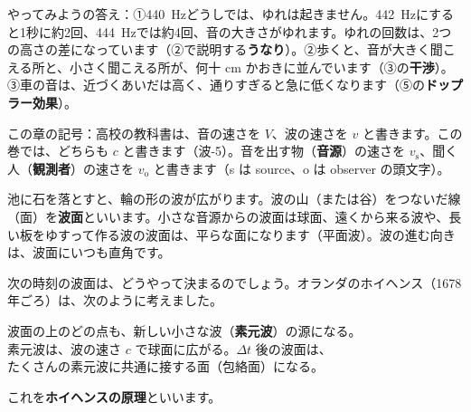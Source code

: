 \noindent やってみようの答え：①\qty{440}{Hz}どうしでは、ゆれは起きません。\qty{442}{Hz}にすると1秒に約2回、\qty{444}{Hz}では約4回、音の大きさがゆれます。ゆれの回数は、2つの高さの差になっています（②で説明する\textbf{うなり}）。②歩くと、音が大きく聞こえる所と、小さく聞こえる所が、何十 cm かおきに並んでいます（③の\textbf{干渉}）。③車の音は、近づくあいだは高く、通りすぎると急に低くなります（⑤の\textbf{ドップラー効果}）。

\begin{omoidasou}
\end{omoidasou}

\noindent この章の記号：高校の教科書は、音の速さを $V$、波の速さを $v$ と書きます。この巻では、どちらも $c$ と書きます（波-5）。音を出す物（\textbf{音源}）の速さを $v_{\mathrm s}$、聞く人（\textbf{観測者}）の速さを $v_{\mathrm o}$ と書きます（s は source、o は observer の頭文字）。


\label{ph:波-8:sec1}
池に石を落とすと、輪の形の波が広がります。波の山（または谷）をつないだ線（面）を\textbf{波面}といいます。小さな音源からの波面は球面、遠くから来る波や、長い板をゆすって作る波の波面は、平らな面になります（平面波）。波の進む向きは、波面にいつも直角です。

次の時刻の波面は、どうやって決まるのでしょう。オランダのホイヘンス（1678年ごろ）は、次のように考えました。
\begin{bkcenter}
波面の上のどの点も、新しい小さな波（\textbf{素元波}）の源になる。\\
素元波は、波の速さ $c$ で球面に広がる。$\Delta t$ 後の波面は、\\
たくさんの素元波に共通に接する面（包絡面）になる。
\end{bkcenter}
\label{ph:波-8:huygens}これを\textbf{ホイヘンスの原理}といいます。

